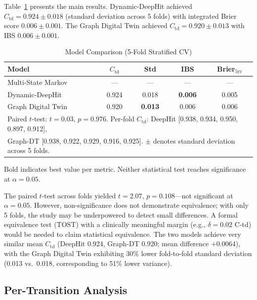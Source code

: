 Table~\ref{p3:tab:comparison} presents the main results. Dynamic-DeepHit achieved $C_\text{td} = 0.924 \pm 0.018$ (standard deviation across 5 folds) with integrated Brier score $0.006 \pm 0.001$. The Graph Digital Twin achieved $C_\text{td} = 0.920 \pm 0.013$ with IBS $0.006 \pm 0.001$.

\begin{table}[!t]
\centering
\caption{Model Comparison (5-Fold Stratified CV)}
\label{p3:tab:comparison}
\small
\begin{tabular}{lcccc}
\toprule
Model & $C_\text{td}$ & Std & IBS & Brier$_{5\text{yr}}$ \\
\midrule
Multi-State Markov & --- & --- & --- & --- \\
Dynamic-DeepHit & 0.924 & 0.018 & \textbf{0.006} & 0.005 \\
Graph Digital Twin & 0.920 & \textbf{0.013} & 0.006 & 0.006 \\
\midrule
\multicolumn{5}{l}{\scriptsize Paired $t$-test: $t{=}0.03$, $p{=}0.976$. Per-fold $C_\text{td}$: DeepHit [0.938, 0.934, 0.950, 0.897, 0.912],} \\
\multicolumn{5}{l}{\scriptsize Graph-DT [0.938, 0.922, 0.929, 0.916, 0.925]. $\pm$ denotes standard deviation across 5 folds.} \\
\bottomrule
\end{tabular}
\vspace{2pt}
\begin{flushleft}
\scriptsize{Bold indicates best value per metric. Neither statistical test reaches significance at $\alpha{=}0.05$.}
\end{flushleft}
\end{table}

The paired $t$-test across folds yielded $t{=}2.07$, $p{=}0.108$---not significant at $\alpha{=}0.05$. However, non-significance does not demonstrate equivalence; with only 5 folds, the study may be underpowered to detect small differences. A formal equivalence test (TOST) with a clinically meaningful margin (e.g., $\delta{=}0.02$ C-td) would be needed to claim statistical equivalence. The two models achieve very similar mean $C_\text{td}$ (DeepHit 0.924, Graph-DT 0.920; mean difference $+0.0064$), with the Graph Digital Twin exhibiting 30\% lower fold-to-fold standard deviation (0.013 vs.\ 0.018, corresponding to 51\% lower variance).

\subsection{Per-Transition Analysis}

